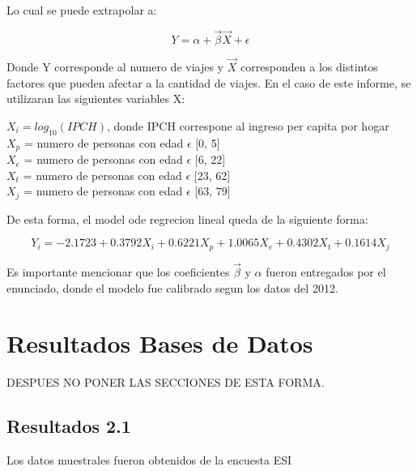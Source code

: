 \documentclass[12pt]{article} %
\begin{document}
Lo cual se puede extrapolar a:

\begin{equation}
    Y = \alpha + \vec{\beta}\vec{X} + \epsilon
\end{equation}

Donde Y corresponde al numero de viajes y $\vec{X}$ corresponden a los distintos factores que pueden afectar a la cantidad de viajes. En el caso de este informe, se utilizaran las siguientes variables X:

\begin{center}
    $X_i = log_{10}(IPCH)$, donde IPCH correspone al ingreso per capita por hogar\\
    $X_p$ = numero de personas con edad $\epsilon$ [0, 5]\\
    $X_e$ = numero de personas con edad $\epsilon$ [6, 22]\\
    $X_t$ = numero de personas con edad $\epsilon$ [23, 62]\\
    $X_j$ = numero de personas con edad $\epsilon$ [63, 79]\\
\end{center}

De esta forma, el model ode regrecion lineal queda de la siguiente forma:

\begin{equation}
    Y_i = -2.1723 + 0.3792X_i + 0.6221X_p + 1.0065X_e + 0.4302X_t + 0.1614X_j
    \label{eq:regrecion}
\end{equation}

Es importante mencionar que los coeficientes $\vec{\beta}$ y $\alpha$ fueron entregados por el enunciado, donde el modelo fue calibrado segun los datos del 2012.

\section{Resultados Bases de Datos}
DESPUES NO PONER LAS SECCIONES DE ESTA FORMA.

\subsection{Resultados 2.1}

Los datos muestrales fueron obtenidos de la encuesta ESI \textbf{\cite{esi}}
\end{document}
